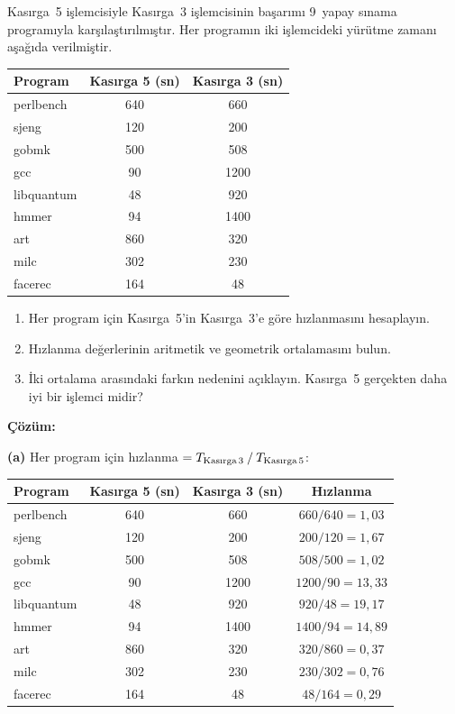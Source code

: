 \begin{ornek}[2.8]
Kasırga~5 işlemcisiyle Kasırga~3 işlemcisinin başarımı 9~yapay sınama programıyla karşılaştırılmıştır. Her programın iki işlemcideki yürütme zamanı aşağıda verilmiştir.

\begin{center}
\small
\begin{tabular}{lcc}
\toprule
\textbf{Program} & \textbf{Kasırga 5 (sn)} & \textbf{Kasırga 3 (sn)} \\
\midrule
perlbench    & 640 & 660  \\
sjeng        & 120 & 200  \\
gobmk        & 500 & 508  \\
gcc          & 90  & 1200 \\
libquantum   & 48  & 920  \\
hmmer        & 94  & 1400 \\
art          & 860 & 320  \\
milc         & 302 & 230  \\
facerec      & 164 & 48   \\
\bottomrule
\end{tabular}
\end{center}

\begin{enumerate}[label=(\alph*)]
\item Her program için Kasırga~5'in Kasırga~3'e göre hızlanmasını hesaplayın.
\item Hızlanma değerlerinin aritmetik ve geometrik ortalamasını bulun.
\item İki ortalama arasındaki farkın nedenini açıklayın. Kasırga~5 gerçekten daha iyi bir işlemci midir?
\end{enumerate}

\textbf{Çözüm:}

\textbf{(a)} Her program için hızlanma $= T_{\text{Kasırga\,3}} \mathbin{/} T_{\text{Kasırga\,5}}$:

\begin{center}
\small
\begin{tabular}{lccc}
\toprule
\textbf{Program} & \textbf{Kasırga 5 (sn)} & \textbf{Kasırga 3 (sn)} & \textbf{Hızlanma} \\
\midrule
perlbench    & 640 & 660  & $660/640 = 1{,}03$ \\
sjeng        & 120 & 200  & $200/120 = 1{,}67$ \\
gobmk        & 500 & 508  & $508/500 = 1{,}02$ \\
gcc          & 90  & 1200 & $1200/90 = 13{,}33$ \\
libquantum   & 48  & 920  & $920/48 = 19{,}17$ \\
hmmer        & 94  & 1400 & $1400/94 = 14{,}89$ \\
art          & 860 & 320  & $320/860 = 0{,}37$ \\
milc         & 302 & 230  & $230/302 = 0{,}76$ \\
facerec      & 164 & 48   & $48/164 = 0{,}29$ \\
\bottomrule
\end{tabular}
\end{center}


\end{ornek}
